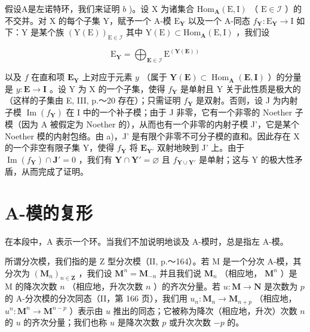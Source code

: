 假设A是左诺特环，我们来证明 \(b\) )。设 X 为诸集合 \(\mathrm{Hom}_{\mathbf{A}}(\mathrm{E},\mathrm{I})\) （ \(\mathrm{E}\in\mathcal{I}\) ）的不交并。对 X 的每个子集 Y，赋予一个 A-模 \(\mathrm{E}_{\mathbf{Y}}\) 以及一个 A-同态 \(f_{\mathbf{Y}}:\mathrm{E}_{\mathbf{Y}}\to\mathrm{I}\) 如下：Y 是某个族 \((\mathrm{Y}(\mathrm{E}))_{\mathrm{E}\in\mathcal{I}}\) 其中 \(\mathrm{Y}(\mathrm{E})\subset\mathrm{Hom}_{\mathbf{A}}(\mathrm{E},\mathrm{I})\) ，我们设

\[
\mathrm{E} _ {\mathbf {Y}} = \bigoplus_ {\mathbf {E} \in \mathcal {I}} \mathrm{E} ^ {(\mathbf {Y} (\mathbf {E}))}
\]

以及 \(f\) 在直和项 \(\mathbf{E}_{\mathbf{Y}}\) 上对应于元素 \(y\) （属于 \(\mathbf{Y}(\mathbf{E}) \subset \operatorname{Hom}_{\mathbf{A}}(\mathbf{E}, \mathbf{I})\) ）的分量是 \(y: \mathbf{E} \to \mathbf{I}\) 。设 Y 为 X 的一个子集，使得 \(f_{\mathbf{Y}}\) 是单射且 Y 关于此性质是极大的（这样的子集由 E, III, p.～20 存在）；只需证明 \(f_{\mathbf{Y}}\) 是双射。否则，设 J 为内射子模 \(\operatorname{Im}(f_{\mathbf{Y}})\) 在 I 中的一个补子模；由于 J 非零，它有一个非零的 Noether 子模（因为 A 被假定为 Noether 的），从而也有一个非零的内射子模 J'，它是某个 Noether 模的内射包络。由 a)，J' 是有限个非零不可分子模的直和。因此存在 X 的一个非空有限子集 Y，使得 \(f_{\mathbf{Y}}\) 将 \(\mathbf{E}_{\mathbf{Y}'}\) 双射地映到 J' 上。由于 \(\operatorname{Im}(f_{\mathbf{Y}}) \cap \mathbf{J}' = 0\) ，我们有 \(\mathbf{Y} \cap \mathbf{Y}' = \varnothing\) 且 \(f_{\mathbf{Y} \cup \mathbf{Y}'}\) 是单射；这与 Y 的极大性矛盾，从而完成了证明。

\section{A-模的复形}

在本段中，A 表示一个环。当我们不加说明地谈及 A-模时，总是指左 A-模。

所谓分次模，我们指的是 Z 型分次模（II, p.～164）。若 M 是一个分次 A-模，其分次为 \((\mathbf{M}_n)_{n \in \mathbf{Z}}\) ，我们设 \(\mathbf{M}^n = \mathbf{M}_{-n}\) 并且我们说 \(\mathbf{M}_n\) （相应地， \(\mathbf{M}^n\) ）是 M 的降次次数 \(n\) （相应地，升次次数 \(n\) ）的齐次分量。若 \(u: \mathbf{M} \to \mathbf{N}\) 是次数为 \(p\) 的 A-分次模的分次同态（II，第 166 页），我们用 \(u_n: \mathbf{M}_n \to \mathbf{M}_{n+p}\) （相应地， \(u^n: \mathbf{M}^n \to \mathbf{M}^{n-p}\) ）表示由 \(u\) 推出的同态；它被称为降次（相应地，升次）次数 \(n\) 的 \(u\) 的齐次分量；我们也称 \(u\) 是降次次数 \(p\) 或升次次数 \(-p\) 的。

